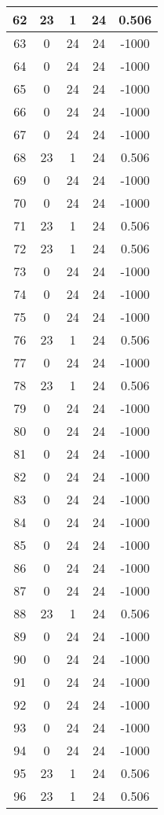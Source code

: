 \documentclass[letterpaper, 12pt]{article}
\begin{document}
\begin{longtable}{|c|c|c|c|c|}
\hline
62 & 23 & 1 & 24 & 0.506 \\
\hline
63 & 0 & 24 & 24 & -1000 \\
\hline
64 & 0 & 24 & 24 & -1000 \\
\hline
65 & 0 & 24 & 24 & -1000 \\
\hline
66 & 0 & 24 & 24 & -1000 \\
\hline
67 & 0 & 24 & 24 & -1000 \\
\hline
68 & 23 & 1 & 24 & 0.506 \\
\hline
69 & 0 & 24 & 24 & -1000 \\
\hline
70 & 0 & 24 & 24 & -1000 \\
\hline
71 & 23 & 1 & 24 & 0.506 \\
\hline
72 & 23 & 1 & 24 & 0.506 \\
\hline
73 & 0 & 24 & 24 & -1000 \\
\hline
74 & 0 & 24 & 24 & -1000 \\
\hline
75 & 0 & 24 & 24 & -1000 \\
\hline
76 & 23 & 1 & 24 & 0.506 \\
\hline
77 & 0 & 24 & 24 & -1000 \\
\hline
78 & 23 & 1 & 24 & 0.506 \\
\hline
79 & 0 & 24 & 24 & -1000 \\
\hline
80 & 0 & 24 & 24 & -1000 \\
\hline
81 & 0 & 24 & 24 & -1000 \\
\hline
82 & 0 & 24 & 24 & -1000 \\
\hline
83 & 0 & 24 & 24 & -1000 \\
\hline
84 & 0 & 24 & 24 & -1000 \\
\hline
85 & 0 & 24 & 24 & -1000 \\
\hline
86 & 0 & 24 & 24 & -1000 \\
\hline
87 & 0 & 24 & 24 & -1000 \\
\hline
88 & 23 & 1 & 24 & 0.506 \\
\hline
89 & 0 & 24 & 24 & -1000 \\
\hline
90 & 0 & 24 & 24 & -1000 \\
\hline
91 & 0 & 24 & 24 & -1000 \\
\hline
92 & 0 & 24 & 24 & -1000 \\
\hline
93 & 0 & 24 & 24 & -1000 \\
\hline
94 & 0 & 24 & 24 & -1000 \\
\hline
95 & 23 & 1 & 24 & 0.506 \\
\hline
96 & 23 & 1 & 24 & 0.506 \\

\end{longtable}
\end{document}
